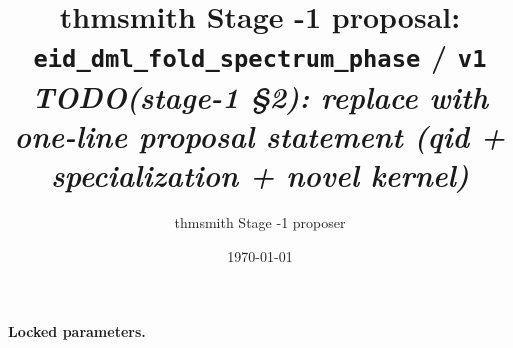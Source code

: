 \documentclass[11pt]{article}
\title{thmsmith Stage -1 proposal: \texttt{eid\_dml\_fold\_spectrum\_phase} / \texttt{v1}%
  \\ \large\textit{TODO(stage-1 \S2): replace with one-line proposal statement (qid + specialization + novel kernel)}}
\author{thmsmith Stage -1 proposer}
\date{\today}
\theoremstyle{definition}
\theoremstyle{plain}
\theoremstyle{remark}
\begin{document}
\maketitle


\paragraph{Locked parameters.}

\begin{abstract}
\end{abstract}
\end{document}

